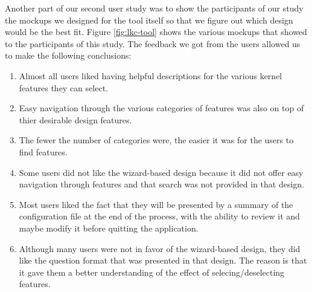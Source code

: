 \documentclass{chi2009}
\begin{document}
Another part of our second user study was to show the participants of our study the mockups we designed for the tool itself so that we figure out which design
would be the best fit. Figure \ref{fig:lkc-tool} shows the various mockups that showed to the participants of this study. The feedback we got from the users
allowed us to make the following conclusions:
\begin{enumerate}
 \item Almost all users liked having helpful descriptions for the various kernel features they can select.
 \item Easy navigation through the various categories of features was also on top of thier desirable design features.
 \item The fewer the number of categories were, the easier it was for the users to find features.
 \item Some users did not like the wizard-based design because it did not offer easy navigation through features and that search was not provided in that
design.
 \item Most users liked the fact that they will be presented by a summary of the configuration file at the end of the process, with the ability to review it
and maybe modify it before quitting the application.
 \item Although many users were not in favor of the wizard-based design, they did like the question format that was presented in that design. The reason is
that it gave them a better understanding of the effect of selecing/deselecting features.
\end{enumerate}
\end{document}
